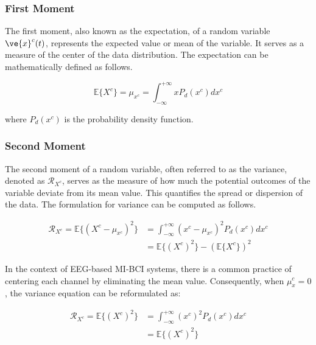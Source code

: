 \subsubsection{First Moment}

The first moment, also known as the expectation, of a random variable $\ve{x}^c(t)$, represents the expected value or mean of the variable. It serves as a measure of the center of the data distribution. The expectation can be mathematically defined as follows.

\begin{equation}
    \mathbb{E}\{X^{c}\} = \mu_{x^{c}} = \int_{-\infty}^{+\infty} x P_d(x^{c}) dx^{c}
\end{equation}

where $P_d(x^{c})$ is the probability density function.

\subsubsection{Second Moment}

The second moment of a random variable, often referred to as the variance, denoted as $\mathcal{R}_{X^c}$, serves as the measure of how much the potential outcomes of the variable deviate from its mean value. This quantifies the spread or dispersion of the data. The formulation for variance can be computed as follows.

\begin{equation}
  \begin{split}
    \mathcal{R}_{X^c} = \mathbb{E}\{(X^{c} - \mu_{x^{c}})^2\} &= \int_{-\infty}^{+\infty} \left( x^{c}-\mu_{x^{c}} \right) ^2 P_d(x^{c}) dx^{c} \\
    &= \mathbb{E}\{(X^{c})^2\} - (\mathbb{E}\{X^{c}\})^2
  \end{split}
\end{equation}

In the context of EEG-based MI-BCI systems, there is a common practice of centering each channel by eliminating the mean value. Consequently, when $\mu_x^{c}=0$, the variance equation can be reformulated as:

\begin{equation}
  \begin{split}
    \mathcal{R}_{X^c} = \mathbb{E}\{(X^{c})^2\} &= \int_{-\infty}^{+\infty}  (x^{c})^2 P_d(x^{c}) dx^{c} \\
    &= \mathbb{E}\{(X^{c})^2\}
  \end{split}
\end{equation}

